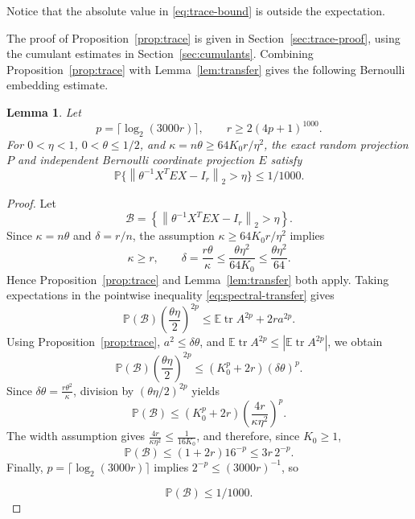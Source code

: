 \documentclass[11pt]{article}
\newtheorem{lemma}[theorem]{Lemma}
\theoremstyle{definition}
\theoremstyle{remark}
\theoremstyle{plain}
\newcommand{\E}{\mathbb E}
\newcommand{\Prob}{\mathbb P}
\DeclareMathOperator{\tr}{tr}
\newcommand{\norm}[1]{\left\lVert#1\right\rVert_2}
\begin{document}
Notice that the absolute value in \eqref{eq:trace-bound} is outside the expectation.

The proof of Proposition~\ref{prop:trace} is given in
Section~\ref{sec:trace-proof}, using the cumulant estimates in
Section~\ref{sec:cumulants}. Combining Proposition~\ref{prop:trace}
with Lemma~\ref{lem:transfer} gives the following Bernoulli
embedding estimate.


\begin{samepage}
\begin{lemma}\label{cor:bernoulli}
Let
\[
 p=\lceil\log_2(3000r)\rceil,
 \qquad
 r\ge2(4p+1)^{1000}.
\]
For \(0<\eta<1\), \(0<\theta\le1/2\), and
\(\kappa=n\theta\ge64K_0r/\eta^2\), the exact random projection \(P\)
and independent Bernoulli coordinate projection \(E\) satisfy
\begin{equation}\label{eq:bernoulli-bound}
 \Prob\{\norm{\theta^{-1}X^TEX-I_r}>\eta\}\le1/1000.
\end{equation}
\end{lemma}
\end{samepage}
\begin{proof}
Let
$$
 \mathcal B
   =\left\{
      \norm{\theta^{-1}X^TEX-I_r}>\eta
     \right\}.
$$
Since \(\kappa=n\theta\) and \(\delta=r/n\), the assumption
\(\kappa\ge64K_0r/\eta^2\) implies
$$
 \kappa\ge r,
 \qquad
 \delta=\frac{r\theta}{\kappa}
     \le \frac{\theta\eta^2}{64K_0}
     \le \frac{\theta\eta^2}{64}.
$$
Hence Proposition~\ref{prop:trace} and
Lemma~\ref{lem:transfer} both apply. 
Taking expectations in the pointwise inequality
\eqref{eq:spectral-transfer} gives
$$
 \Prob(\mathcal B)\left(\frac{\theta\eta}{2}\right)^{2p}
 \le
 \E\tr A^{2p}+2r a^{2p}.
$$
Using Proposition~\ref{prop:trace},
\(a^2\le\delta\theta\), and
\(\E\tr A^{2p}\le|\E\tr A^{2p}|\), we obtain
$$
 \Prob(\mathcal B)\left(\frac{\theta\eta}{2}\right)^{2p}
 \le
 (K_0^p+2r)(\delta\theta)^p.
$$
Since
$
 \delta\theta=\frac{r\theta^2}{\kappa}
$, 
division by \((\theta\eta/2)^{2p}\) yields
$$
 \Prob(\mathcal B)
 \le
 (K_0^p+2r)
 \left(\frac{4r}{\kappa\eta^2}\right)^p.
$$
The width assumption gives
$
 \frac{4r}{\kappa\eta^2}\le\frac1{16K_0}
$, 
and therefore, since \(K_0\ge1\),
$$
 \Prob(\mathcal B)
 \le
 (1+2r)16^{-p}
 \le
 3r\,2^{-p}.
$$
Finally,
\(p=\lceil\log_2(3000r)\rceil\) implies
\(2^{-p}\le(3000r)^{-1}\), so

$$
 \Prob(\mathcal B)\le 1/{1000}.
$$

\end{proof}
\end{document}
